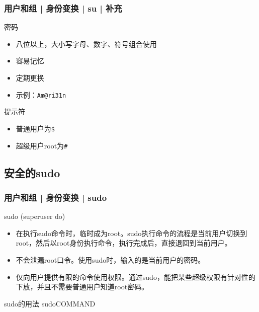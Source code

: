 \begin{frame}[fragile]
  \frametitle{用户和组 | 身份变换 | su | 补充}
  \begin{block}{密码}
    \begin{itemize}
      \item 八位以上，大小写字母、数字、符号组合使用
      \item 容易记忆
      \item 定期更换
      \item 示例：\verb|Am@ri31n|
    \end{itemize}
  \end{block}
  \pause
  \begin{block}{\alert{提示符}}
    \begin{itemize}
      \item 普通用户为\verb|$|
      \item 超级用户root为\verb|#|
    \end{itemize}
  \end{block}
\end{frame}

\subsection{安全的sudo}
\begin{frame}
  \frametitle{用户和组 | 身份变换 | sudo}
  \begin{block}{sudo (superuser do)}
    \begin{itemize}
      \item 在执行sudo命令时，临时成为root。sudo执行命令的流程是当前用户切换到root，然后以root身份执行命令，执行完成后，直接退回到当前用户。
      \item 不会泄漏root口令。使用sudo时，输入的是当前用户的密码。
      \item 仅向用户提供有限的命令使用权限。通过sudo，能把某些超级权限有针对性的下放，并且不需要普通用户知道root密码。
    \end{itemize}
  \end{block}
  \pause
  \begin{block}{sudo的用法}
    \alert{sudo\quad COMMAND}
  \end{block}
\end{frame}

